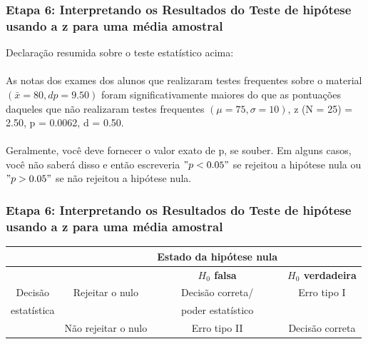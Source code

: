 \documentclass[11pt]{beamer}
\begin{document}
\begin{frame}
\frametitle{Etapa 6: Interpretando os Resultados do Teste de hipótese usando a z para uma média amostral}

Declaração resumida sobre o teste estatístico acima:\\~\\
As notas dos exames dos alunos que realizaram testes frequentes sobre o material $(\bar{x} = 80, dp = 9.50)$ foram significativamente maiores do que as pontuações daqueles que não realizaram testes frequentes $(\mu = 75, \sigma = 10)$, z (N = 25) = 2.50, p = 0.0062, d = 0.50.\\~\\

Geralmente, você deve fornecer o valor exato de p, se souber. Em alguns casos, você não saberá disso e então escreveria \("p < 0.05"\) se rejeitou a hipótese nula ou \("p > 0.05"\) se não rejeitou a hipótese nula.
\end{frame}

\begin{frame}
\frametitle{Etapa 6: Interpretando os Resultados do Teste de hipótese usando a z para uma média amostral}

\begin{center}
\begin{tabular}{cccc} 
 \hline
&  & Estado da hipótese nula & \\
 \hline
& & \textbf{$H_0$ falsa} & \textbf{$H_0$ verdadeira}\\
Decisão & Rejeitar o nulo & Decisão correta/ & Erro tipo I \\
estatística &  & poder estatístico &  \\
& Não rejeitar o nulo & Erro tipo II & Decisão correta\\
 \hline
\end{tabular}
\end{center}

\end{frame}
\end{document}
